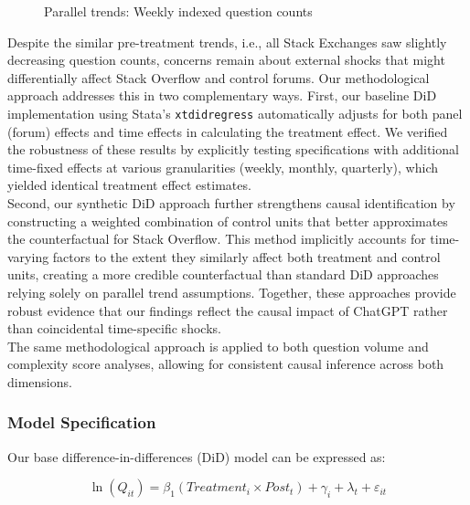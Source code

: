\begin{figure}[htpb!]
    \centering
    
    \caption{Parallel trends: Weekly indexed question counts}
    \label{fig:paralleL_trend_trans}
\end{figure}

Despite the similar pre-treatment trends, i.e., all Stack Exchanges saw slightly decreasing question counts, concerns remain about external shocks that might differentially affect Stack Overflow and control forums. Our methodological approach addresses this in two complementary ways. First, our baseline DiD implementation using Stata's \texttt{xtdidregress} automatically adjusts for both panel (forum) effects and time effects in calculating the treatment effect. We verified the robustness of these results by explicitly testing specifications with additional time-fixed effects at various granularities (weekly, monthly, quarterly), which yielded identical treatment effect estimates.\\

Second, our synthetic DiD approach further strengthens causal identification by constructing a weighted combination of control units that better approximates the counterfactual for Stack Overflow. This method implicitly accounts for time-varying factors to the extent they similarly affect both treatment and control units, creating a more credible counterfactual than standard DiD approaches relying solely on parallel trend assumptions. Together, these approaches provide robust evidence that our findings reflect the causal impact of ChatGPT rather than coincidental time-specific shocks.\\

The same methodological approach is applied to both question volume and complexity score analyses, allowing for consistent causal inference across both dimensions.


\subsubsection{Model Specification}
Our base difference-in-differences (DiD) model can be expressed as:

\begin{equation}\label{eq:basedid}
\ln(Q_{it}) = \beta_1(Treatment_i \times Post_t) + \gamma_i + \lambda_t + \varepsilon_{it}
\end{equation}


